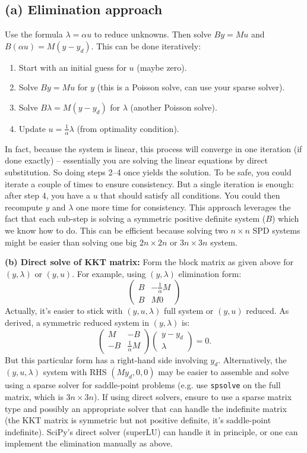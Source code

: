 \documentclass[a4paper,10pt]{article}
\begin{document}
\subsection{(a) Elimination approach}
Use the formula \(\lambda = \alpha u\) to reduce unknowns. Then solve \(B y = M u\) and \(B (\alpha u) = M(y - y_d)\). This can be done iteratively:
\begin{enumerate}
	\item Start with an initial guess for \(u\) (maybe zero).
	\item Solve \(B y = M u\) for \(y\) (this is a Poisson solve, can use your sparse solver).
	\item Solve \(B \lambda = M(y - y_d)\) for \(\lambda\) (another Poisson solve).
	\item Update \(u = \frac{1}{\alpha}\lambda\) (from optimality condition).
\end{enumerate}
In fact, because the system is linear, this process will converge in one iteration (if done exactly) – essentially you are solving the linear equations by direct substitution. So doing steps 2–4 once yields the solution. To be safe, you could iterate a couple of times to ensure consistency. But a single iteration is enough: after step 4, you have a \(u\) that should satisfy all conditions. You could then recompute \(y\) and \(\lambda\) one more time for consistency. This approach leverages the fact that each sub-step is solving a symmetric positive definite system (\(B\)) which we know how to do. This can be efficient because solving two \(n\times n\) SPD systems might be easier than solving one big \(2n \times 2n\) or \(3n \times 3n\) system.

\textbf{(b) Direct solve of KKT matrix:} Form the block matrix as given above for \((y,\lambda)\) or \((y,u)\). For example, using \((y,\lambda)\) elimination form:
\[
	\begin{pmatrix}
		B & -\frac{1}{\alpha} M \\
		B & M 0
	\end{pmatrix}
\]
Actually, it's easier to stick with \((y,u,\lambda)\) full system or \((y,u)\) reduced. As derived, a symmetric reduced system in \((y,\lambda)\) is:
\[
	\begin{pmatrix}
		M  & -B                 \\
		-B & \frac{1}{\alpha} M
	\end{pmatrix}
	\begin{pmatrix} y - y_d \\ \lambda \end{pmatrix}
	= 0.
\]
But this particular form has a right-hand side involving \(y_d\). Alternatively, the \((y,u,\lambda)\) system with RHS \((M y_d, 0, 0)\) may be easier to assemble and solve using a sparse solver for saddle-point problems (e.g. use \texttt{spsolve} on the full matrix, which is \(3n \times 3n\)). If using direct solvers, ensure to use a sparse matrix type and possibly an appropriate solver that can handle the indefinite matrix (the KKT matrix is symmetric but not positive definite, it's saddle-point indefinite). SciPy's direct solver (superLU) can handle it in principle, or one can implement the elimination manually as above.
\end{document}
